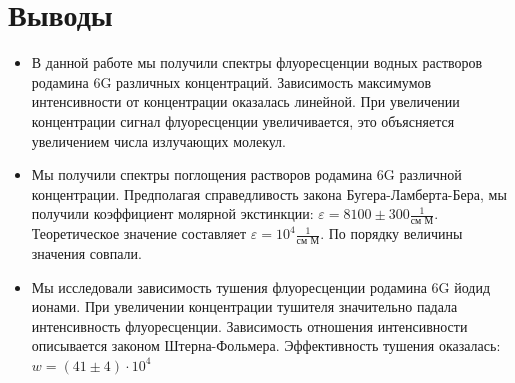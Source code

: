 \documentclass[a4paper,12pt]{article}
\begin{document}
\section*{Выводы}
\begin{itemize}
    \item В данной работе мы получили спектры флуоресценции водных растворов родамина 6G различных концентраций. Зависимость максимумов интенсивности от концентрации оказалась линейной. При увеличении концентрации сигнал флуоресценции увеличивается, это объясняется увеличением числа излучающих молекул. 
    \item Мы получили спектры поглощения растворов родамина 6G различной концентрации. Предполагая справедливость закона Бугера-Ламберта-Бера, мы получили коэффициент молярной экстинкции: $\varepsilon = 8100 \pm 300 \frac{1}{\text{см М}}$. Теоретическое значение составляет $\varepsilon = 10^4 \frac{1}{\text{см М}}$. По порядку величины значения совпали.
    \item Мы исследовали зависимость тушения флуоресценции родамина 6G йодид ионами. При увеличении концентрации тушителя значительно падала интенсивность флуоресценции. Зависимость отношения интенсивности описывается законом Штерна-Фольмера. Эффективность тушения оказалась: $w = (41 \pm 4) \cdot 10^4$
\end{itemize}
\end{document}
